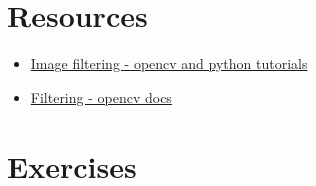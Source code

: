 \documentclass[]{article}
\providecommand{\tightlist}{%
  \setlength{\itemsep}{0pt}\setlength{\parskip}{0pt}}
\begin{document}
\newpage
\section{Resources}\label{resources}

\begin{itemize}
\tightlist
\item
  \href{http://opencv-python-tutroals.readthedocs.org/en/latest/py\_tutorials/py
  \_imgproc/py\_filtering/py\_filtering.html}{Image filtering - opencv and python tutorials}
\item
  \href{http://docs.opencv.org/modules/imgproc/doc/filtering.html\#}{Filtering - opencv docs}
\end{itemize}

\section{Exercises}\label{exercises}
\end{document}
